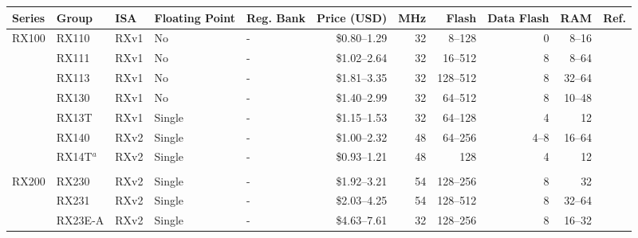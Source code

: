 %
%

\clearpage
\begin{table}
\begin{center}
\scriptsize
\setlength{\tabcolsep}{4pt}
\begin{tabular}{lllllrrrrrl}
\hline
Series & Group          & ISA    & Floating Point & Reg. Bank   & Price (USD)      & MHz      & Flash       & Data Flash   & RAM      & Ref.             \\ \hline
RX100  & RX110          & RXv1   & No             & -           & \$0.80--1.29     & 32       & 8--128      & 0            & 8--16    & \cite{rx_110}    \\
       & RX111          & RXv1   & No             & -           & \$1.02--2.64     & 32       & 16--512     & 8            & 8--64    & \cite{rx_111}    \\
       & RX113          & RXv1   & No             & -           & \$1.81--3.35     & 32       & 128--512    & 8            & 32--64   & \cite{rx_113}    \\
       & RX130          & RXv1   & No             & -           & \$1.40--2.99     & 32       & 64--512     & 8            & 10--48   & \cite{rx_130}    \\
       & RX13T          & RXv1   & Single         & -           & \$1.15--1.53     & 32       & 64--128     & 4            & 12       & \cite{rx_13T}    \\
       & RX140          & RXv2   & Single         & -           & \$1.00--2.32     & 48       & 64--256     & 4--8         & 16--64   & \cite{rx_140}    \\
       & RX14T$^{a}$    & RXv2   & Single         & -           & \$0.93--1.21     & 48       & 128         & 4            & 12       & \cite{rx_14T}    \\
       &                &        &                &             &                  &          &             &              &          &                  \\
RX200  & RX230          & RXv2   & Single         & -           & \$1.92--3.21     & 54       & 128--256    & 8            & 32       & \cite{rx_230}    \\
       & RX231          & RXv2   & Single         & -           & \$2.03--4.25     & 54       & 128--512    & 8            & 32--64   & \cite{rx_230}    \\
       & RX23E-A        & RXv2   & Single         & -           & \$4.63--7.61     & 32       & 128--256    & 8            & 16--32   & \cite{rx_23ea}   \\

\end{tabular}
\end{center}
\end{table}
